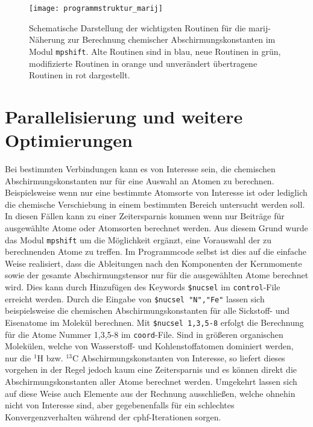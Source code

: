 \begin{figure}[ht!]
\centering
\texttt{[image: programmstruktur\_marij]}
\captionsetup{figurewithin = chapter}
\captionsetup{font=small, labelfont=bf}\caption[\ac{marij} Routinen für chemische Abschirmungskonstanten]{Schematische Darstellung der wichtigsten Routinen für die \ac{marij}-Näherung zur Berechnung chemischer Abschirmungskonstanten im Modul \texttt{mpshift}. Alte Routinen sind in blau, neue Routinen in grün, modifizierte Routinen in orange und unverändert übertragene Routinen in rot dargestellt.}
\label{abb:programmstrukur_marij}
\end{figure}



\section{Parallelisierung und weitere Optimierungen}\label{paraopt}
Bei bestimmten Verbindungen kann es von Interesse sein, die chemischen Abschirmungskonstanten nur für eine Auswahl an Atomen zu berechnen. Beispielsweise wenn nur eine bestimmte Atomsorte von Interesse ist oder lediglich die chemische Verschiebung in einem bestimmten Bereich untersucht werden soll. In diesen Fällen kann zu einer Zeitersparnis kommen wenn nur Beiträge für ausgewählte Atome oder Atomsorten berechnet werden. Aus diesem Grund wurde das Modul \texttt{mpshift} um die Möglichkeit ergänzt, eine Vorauswahl der zu berechnenden Atome zu treffen. Im Programmcode selbst ist dies auf die einfache Weise realisiert, dass die Ableitungen nach den Komponenten der Kernmomente sowie der gesamte Abschirmungstensor nur für die ausgewählten Atome berechnet wird. Dies kann durch Hinzufügen des Keywords \texttt{\$nucsel} im \texttt{control}-File erreicht werden. Durch die Eingabe von \texttt{\$nucsel "N","Fe"} lassen sich beispielsweise die chemischen Abschirmungskonstanten für alle Sickstoff- und Eisenatome im Molekül berechnen. Mit \texttt{\$nucsel 1,3,5-8} erfolgt die Berechnung für die Atome Nummer 1,3,5-8 im \texttt{coord}-File. Sind in größeren organischen Molekülen, welche von Wasserstoff- und Kohlenstoffatomen dominiert werden, nur die $^1$H bzw. $^{13}$C Abschirmungskonstanten von Interesse, so liefert dieses vorgehen in der Regel jedoch kaum eine Zeitersparnis und es können direkt die Abschirmungskonstanten aller Atome berechnet werden. Umgekehrt lassen sich auf diese Weise auch Elemente aus der Rechnung ausschließen, welche ohnehin nicht von Interesse sind, aber gegebenenfalls für ein schlechtes Konvergenzverhalten während der \ac{cphf}-Iterationen sorgen.

